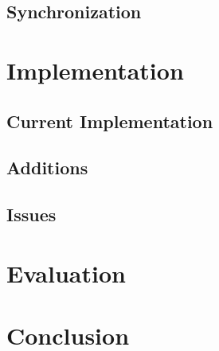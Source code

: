 \documentclass[12pt,twocolumn]{article}
\begin{document}
\subsection{Synchronization}





\section{Implementation}

\subsection{Current Implementation}

\subsection{Additions}

\subsection{Issues}




\section{Evaluation}




\section{Conclusion}
\end{document}
